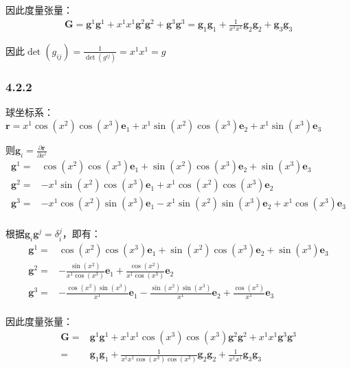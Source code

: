 \documentclass[UTF8,zihao=5]{ctexart}
\newcommand{\bm}[1]{{\mathbf{#1}}}
\newcommand*{\pd}[2]{\frac{\partial #1}{\partial #2}}
\begin{document}
因此度量张量：
$$
    \begin{aligned}
        \bm{G}=\bm{g}^1\bm{g}^1 + x^1x^1 \bm{g}^2\bm{g}^2 + \bm{g}^3\bm{g}^3
        =\bm{g}_1\bm{g}_1 + \frac{1}{x^1x^1} \bm{g}_2\bm{g}_2 + \bm{g}_3\bm{g}_3
    \end{aligned}
$$

因此$\det(g_{ij})=\frac{1}{\det(g^{ij})}=x^1x^1=g$

\subsubsection*{4.2.2}

球坐标系：$\bm{r}= x^1\cos{(x^2)}\cos{(x^3)} \bm{e}_1 + x^1\sin{(x^2)}\cos{(x^3)}\bm{e}_2 + x^1\sin{(x^3)}\bm{e}_3$

则$\bm{g}_i=\pd{\bm{r}}{x^i}$
$$
    \begin{aligned}
        \bm{g}^1 = & \cos(x^2)\cos(x^3)\bm{e}_1 + \sin(x^2)\cos(x^3)\bm{e}_2 +\sin(x^3)\bm{e}_3             \\
        \bm{g}^2 = & -x^1\sin(x^2)\cos(x^3)\bm{e}_1 +  x^1\cos(x^2)\cos(x^3)\bm{e}_2                        \\
        \bm{g}^3 = & -x^1\cos(x^2)\sin(x^3)\bm{e}_1 - x^1\sin(x^2)\sin(x^3)\bm{e}_2 +  x^1\cos(x^3)\bm{e}_3 \\
    \end{aligned}
$$

根据$\bm{g}_i\bm{g}^j=\delta_i^j$，即有：
$$
    \begin{aligned}
        \bm{g}^1 = & \cos(x^2)\cos(x^3)\bm{e}_1 + \sin(x^2)\cos(x^3)\bm{e}_2 +\sin(x^3)\bm{e}_3                                     \\
        \bm{g}^2 = & -\frac{\sin(x^2)}{x^1\cos(x^3)}\bm{e}_1 + \frac{\cos(x^2)}{x^1\cos(x^3)}\bm{e}_2                               \\
        \bm{g}^3 = & -\frac{\cos(x^2)\sin(x^3)}{x^1}\bm{e}_1  -\frac{\sin(x^2)\sin(x^3)}{x^1}\bm{e}_2+\frac{\cos(x^3)}{x^1}\bm{e}_3 \\
    \end{aligned}
$$

因此度量张量：
$$
    \begin{aligned}
        \bm{G}= & \bm{g}^1\bm{g}^1 + x^1x^1\cos(x^3)\cos(x^3) \bm{g}^2\bm{g}^2 + x^1x^1\bm{g}^3\bm{g}^3                      \\
        =       & \bm{g}_1\bm{g}_1 + \frac{1}{x^1x^1\cos(x^3)\cos(x^3)} \bm{g}_2\bm{g}_2 + \frac{1}{x^1x^1} \bm{g}_3\bm{g}_3
    \end{aligned}
$$
\end{document}
